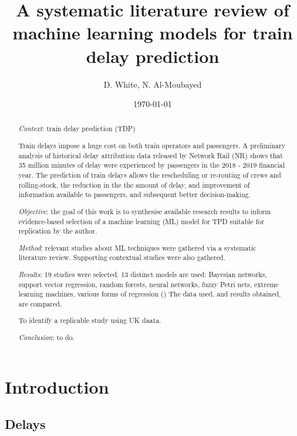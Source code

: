 \documentclass{article}
\title{A systematic literature review of machine learning models for train delay prediction}
\author{D. White, N. Al-Moubayed}
\date{\today}
\begin{document}
\begin{titlingpage}

\maketitle
\begin{abstract}

\textit{Context}: train delay prediction (TDP) 

Train delays impose a huge cost on both train operators and passengers. A preliminary analysis of historical delay attribution data released by Network Rail (NR) shows that
35 million minutes of delay were experienced by passengers in the 2018 - 2019 financial year. The prediction of train delays allows the rescheduling or re-routing of crews and rolling-stock,
the reduction in the the amount of delay, and improvement of information available to passengers, and subsequent better decision-making. 

\textit{Objective}: the goal of this work is to synthesise available research results to inform evidence-based selection of a machine learning (ML) model for TPD suitable for replication by the author.

\textit{Method}: relevant studies about ML techniques were gathered via a systematic literature review. Supporting contextual studies were also gathered.

\textit{Results}: 19 studies were selected. 13 distinct models are used: Bayesian networks, support vector regression, random forests, neural networks, fuzzy Petri nets, extreme learning machines, various forms of regression () 
The data used, and results obtained, are compared. 

To identify a replicable study using UK daata.

\textit{Conclusion}: to do.

\end{abstract}
\end{titlingpage}

\tableofcontents
\clearpage

\twocolumn

\section{Introduction}

\subsection{Delays}
\end{document}
